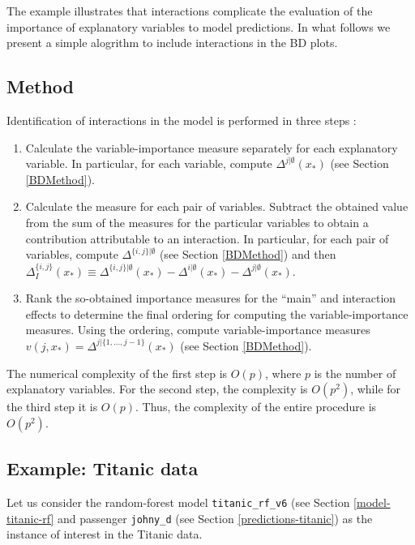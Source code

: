 \documentclass[12pt,]{krantz}
\providecommand{\tightlist}{%
  \setlength{\itemsep}{0pt}\setlength{\parskip}{0pt}}
\begin{document}
The example illustrates that interactions complicate the evaluation of the importance of explanatory variables to model predictions. In what follows we present a simple alogrithm to include interactions in the BD plots.

\hypertarget{iBDMethod}{%
\subsection{Method}\label{iBDMethod}}

Identification of interactions in the model is performed in three steps \citep{iBreakDownRPackage}:

\begin{enumerate}
\def\labelenumi{\arabic{enumi}.}
\tightlist
\item
  Calculate the variable-importance measure separately for each explanatory variable. In particular, for each variable, compute \(\Delta^{j|\emptyset}(x_*)\) (see Section \ref{BDMethod}).
\item
  Calculate the measure for each pair of variables. Subtract the obtained value from the sum of the measures for the particular variables to obtain a contribution attributable to an interaction. In particular, for each pair of variables, compute \(\Delta^{\{i,j\}|\emptyset}\) (see Section \ref{BDMethod}) and then \(\Delta^{\{i,j\}}_I(x_*) \equiv \Delta^{\{i,j\}|\emptyset}(x_*)-\Delta^{i|\emptyset}(x_*)-\Delta^{j|\emptyset}(x_*)\).
\item
  Rank the so-obtained importance measures for the ``main'' and interaction effects to determine the final ordering for computing the variable-importance measures. Using the ordering, compute variable-importance measures \(v(j, x_*) = \Delta^{j|\{1, ..., j-1\}}(x_*)\) (see Section \ref{BDMethod}).
\end{enumerate}

The numerical complexity of the first step is \(O(p)\), where \(p\) is the number of explanatory variables. For the second step, the complexity is \(O(p^2)\), while for the third step it is \(O(p)\). Thus, the complexity of the entire procedure is \(O(p^2)\).

\hypertarget{iBDExample}{%
\subsection{Example: Titanic data}\label{iBDExample}}

Let us consider the random-forest model \texttt{titanic\_rf\_v6} (see Section \ref{model-titanic-rf} and passenger \texttt{johny\_d} (see Section \ref{predictions-titanic}) as the instance of interest in the Titanic data.
\end{document}

